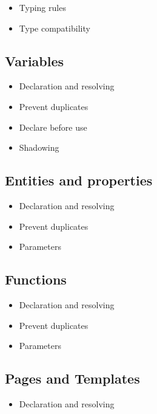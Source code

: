       \begin{itemize}
        \item Typing rules
        \item Type compatibility
      \end{itemize}

    \subsection{\label{subsec:simple-variables}Variables}

      \begin{itemize}
        \item Declaration and resolving
        \item Prevent duplicates
        \item Declare before use
        \item Shadowing
      \end{itemize}

    \subsection{\label{subsec:simple-entities}Entities and properties}

      \begin{itemize}
        \item Declaration and resolving
        \item Prevent duplicates
        \item Parameters
      \end{itemize}

    \subsection{\label{subsec:simple-functions}Functions}

      \begin{itemize}
        \item Declaration and resolving
        \item Prevent duplicates
        \item Parameters
      \end{itemize}

    \subsection{\label{subsec:simple-pages}Pages and Templates}

      \begin{itemize}
        \item Declaration and resolving
      \end{itemize}

